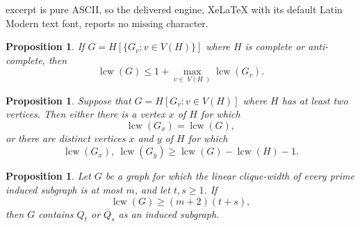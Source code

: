 \documentclass[10pt,a4paper]{amsart}
\newtheorem{proposition}[theorem]{Proposition}
\newcommand{\VH}{\;\!\!V\!(\!H\;\!\!)\!}
\newcommand{\lcw}{\operatorname{lcw}}
\begin{document}
excerpt is pure ASCII, so the delivered engine, XeLaTeX with its default Latin Modern text font, reports no missing character.
\begin{proposition}
\label{prop:lcw:inflation:comp}
If $G=H[\{G_v : v\in V(H)\}]$ where $H$ is complete or anti-complete, then
\[
	\lcw(G)\le 1+\max_{v\in \VH} \lcw(G_v).
\]
\end{proposition}

\begin{proposition}
\label{prop:lcw:two:modules}
Suppose that $G=H[G_v : v\in V(H)]$ where $H$ has at least two vertices. Then either there is a vertex $x$ of $H$ for which
\[
	\lcw(G_x)
	=
	\lcw(G),
\]
or there are distinct vertices $x$ and $y$ of $H$ for which
\[
	\lcw(G_x),\ \lcw(G_y)
	\ge
	\lcw(G)-\lcw(H)-1.
\]
\end{proposition}

\begin{proposition}
\label{prop:main}
Let $G$ be a graph for which the linear clique-width of every prime induced subgraph is at most $m$, and let $t,s\ge 1$. If
\[
	\lcw(G)\ge (m+2)(t+s),
\]
then $G$ contains $Q_t$ or $\overline{Q}_s$ as an induced subgraph.
\end{proposition}
\end{document}
